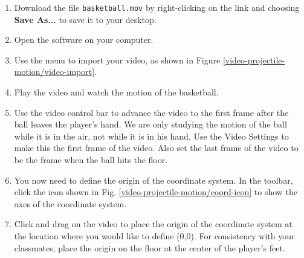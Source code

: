 


\procedure

\begin{enumerate}

	\item Download the file \texttt{basketball.mov} by right-clicking on the link and choosing {\bf Save As...} to save it to your desktop.
	\item Open the  software on your computer.
	\item Use the menu  to import your video, as shown in Figure \ref{video-projectile-motion/video-import}.


	\item Play the video and watch the motion of the basketball. 
	


	\item Use the video control bar to advance the video to the first frame after the ball leaves the player's hand. We are only studying the motion of the ball while it is in the air, not while it is in his hand. Use the Video Settings to make this the first frame of the video. Also set the last frame of the video to be the frame when the ball hits the floor.

	\item You now need to define the origin of the coordinate system. In the toolbar, click the  icon shown in Fig. \ref{video-projectile-motion/coord-icon} to show the axes of the coordinate system.
	

	\item Click and drag on the video to place the origin of the coordinate system at the location where you would like to define (0,0). For consistency with your classmates, place the origin on the floor at the center of the player's feet.
		

\end{enumerate}
